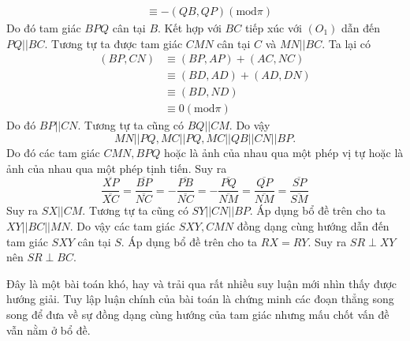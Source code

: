 \begin{bt}
{\begin{align*}
			&\equiv -(QB,QP) (\text{mod}\pi)
		\end{align*}
		Do đó tam giác $BPQ$ cân tại $B$. Kết hợp với $BC$ tiếp xúc với $(O_1)$ dẫn đến $PQ||BC$. 
		Tương tự ta được tam giác $CMN$ cân tại $C$ và $MN||BC$.
		Ta lại có
		\begin{align*}
			(BP,CN)&\equiv (BP,AP)+(AC,NC)\\
			&\equiv (BD,AD)+(AD,DN)\\
			&\equiv (BD,ND)\\
			&\equiv 0 (\text{mod} \pi)
		\end{align*}
		Do đó $BP||CN$. Tương tự ta cũng có $BQ||CM$.
		Do vậy $$MN||PQ, MC||PQ, MC||QB||CN||BP.$$
		Do đó các tam giác $CMN, BPQ$ hoặc là ảnh của nhau qua một phép vị tự hoặc là ảnh của nhau qua một phép tịnh tiến. Suy ra
		$$\dfrac{\overline{XP}}{\overline{XC}}=\dfrac{\overline{BP}}{\overline{NC}}=-\dfrac{\overline{PB}}{\overline{NC}}=-\dfrac{\overline{PQ}}{\overline{NM}}=\dfrac{\overline{QP}}{\overline{NM}}=\dfrac{\overline{SP}}{\overline{SM}}$$
		Suy ra $SX||CM$. Tương tự ta cũng có $SY||CN||BP$. Áp dụng bổ đề trên cho ta $XY||BC||MN$. Do vậy các tam giác $SXY, CMN$ đồng dạng cùng hướng dẫn đến tam giác $SXY$ cân tại $S$.
		Áp dụng bổ đề trên cho ta $RX=RY$. Suy ra $SR\perp XY$ nên $SR\perp BC$.
		\begin{nx}
			Đây là một bài toán khó, hay và trải qua rất nhiều suy luận mới nhìn thấy được hướng giải. Tuy lập luận chính của bài toán là chứng minh các đoạn thẳng song song để đưa về sự đồng dạng cùng hướng của tam giác nhưng mấu chốt vấn đề vẫn nằm ở bổ đề.
		\end{nx}
	}
\end{bt}
